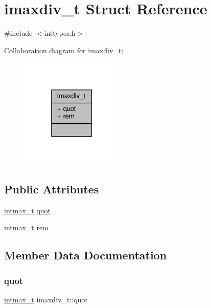 \hypertarget{structimaxdiv__t}{}\section{imaxdiv\+\_\+t Struct Reference}
\label{structimaxdiv__t}


{\ttfamily \#include $<$inttypes.\+h$>$}



Collaboration diagram for imaxdiv\+\_\+t\+:
\nopagebreak
\begin{figure}[H]
\begin{center}
\leavevmode
\includegraphics[width=139pt]{structimaxdiv__t__coll__graph}
\end{center}
\end{figure}
\subsection*{Public Attributes}
\begin{DoxyCompactItemize}
\item 
\hyperlink{stdint_8h_a036cd61bb4b30bb510b9538af4cebd1d}{intmax\+\_\+t} \hyperlink{structimaxdiv__t_a9339814cbb7610c72fb7d30c6573b393}{quot}
\item 
\hyperlink{stdint_8h_a036cd61bb4b30bb510b9538af4cebd1d}{intmax\+\_\+t} \hyperlink{structimaxdiv__t_a6c9701ad10bff81edae7ff679cae7850}{rem}
\end{DoxyCompactItemize}


\subsection{Member Data Documentation}
\mbox{\label{structimaxdiv__t_a9339814cbb7610c72fb7d30c6573b393}} 
\subsubsection{\texorpdfstring{quot}{quot}}
{\footnotesize\ttfamily \hyperlink{stdint_8h_a036cd61bb4b30bb510b9538af4cebd1d}{intmax\+\_\+t} imaxdiv\+\_\+t\+::quot}

